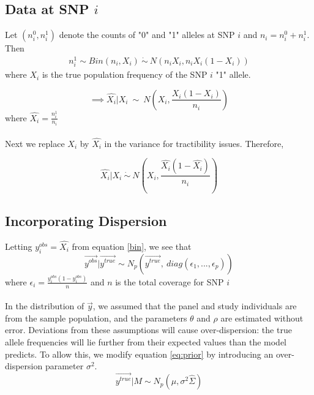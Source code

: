 \documentclass[10pt,a4paper,draft]{article}
\begin{document}
\iffalse
The distribution of $\{y_j: j \neq t\}$ given the test SNP,
\begin{equation}
\{y_i: i \neq t\} | y_t \sim N_{p-1}(\bar{\mu}, \bar{\Sigma}) \label{cond}
\end{equation}
where
\begin{align*}
\bar{\mu} = \vec{\mu_{i \neq t}} + \Sigma_{i \neq t, t}\frac{1}{\sigma_t^2}(y_t-\mu_{t}) 
\end{align*}
and
\begin{align*}
\hat{\Sigma} = \Sigma_{i \neq t, i \neq t} - \Sigma_{i \neq t, t}\frac{1}{\sigma_t^2}\Sigma_{t, i \neq t}
\end{align*}
\fi

\subsection{Data at SNP $i$}
Let $(n_i^0, n_i^1)$ denote the counts of "0" and "1" alleles at SNP $i$ and $n_i = n_i^0 + n_i^1$. Then 
\begin{align*}
n_i^1 \sim Bin(n_i, X_i) \ \dot{\sim}  \ N(n_iX_i, n_iX_i(1-X_i)) \label{eq:napprox}
\end{align*}
where $X_i$ is the true population frequency of the SNP $i$ "1" allele. 


\begin{equation}
\implies  \hat{X_i} | X_i \ \sim \ N(X_i, \frac{X_i(1-X_i)}{n_i})
\end{equation}
where $\hat{X_i} = \frac{n_i^1}{n_i}$ \\
\\
Next we replace $X_i$ by $\hat{X_i}$ in the variance for tractibility issues. Therefore,

\begin{equation}
\hat{X_i} | X_i \ \dot{\sim} \ N(X_i, \frac{\hat{X_i}(1-\hat{X_i})}{n_i}) \label{bin}
\end{equation}


\subsection{Incorporating Dispersion}

Letting $y^{obs}_i = \hat{X_i}$ from equation \ref{bin}, we see that
\begin{equation}
\vec{y^{obs}} | \vec{y^{true}} \sim N_p(\vec{y^{true}}, \ diag(\epsilon_1,...,\epsilon_p))
\end{equation}
where $\epsilon_i = \frac{y^{obs}_i (1-y^{obs}_i)}{n}$ and $n$ is the total coverage for SNP $i$ \\
\\
In the distribution of $\vec{y}$, we assumed that the panel and study individuals are from the sample population, and the parameters $\theta$ and $\rho$ are estimated without error. Deviations from these assumptions will cause over-dispersion: the true allele frequencies will lie further from their expected values than the model predicts. To allow this, we modify equation \ref{eq:prior} by introducing an over-dispersion parameter $\sigma^2$.
\begin{equation}
\vec{y^{true}}|M \sim N_p(\hat{\mu}, \sigma^2\hat{\Sigma})
\end{equation}
\end{document}
